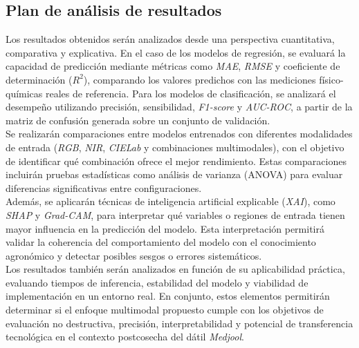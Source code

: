 \subsection{Plan de análisis de resultados}

Los resultados obtenidos serán analizados desde una perspectiva cuantitativa, comparativa y explicativa. En el caso de los modelos de regresión, se evaluará la capacidad de predicción mediante métricas como \textit{MAE}, \textit{RMSE} y coeficiente de determinación (\textit{$R^2$}), comparando los valores predichos con las mediciones físico-químicas reales de referencia. Para los modelos de clasificación, se analizará el desempeño utilizando precisión, sensibilidad, \textit{F1-score} y \textit{AUC-ROC}, a partir de la matriz de confusión generada sobre un conjunto de validación.\\

Se realizarán comparaciones entre modelos entrenados con diferentes modalidades de entrada (\textit{RGB}, \textit{NIR}, \textit{CIELab} y combinaciones multimodales), con el objetivo de identificar qué combinación ofrece el mejor rendimiento. Estas comparaciones incluirán pruebas estadísticas como análisis de varianza (ANOVA) para evaluar diferencias significativas entre configuraciones.\\

Además, se aplicarán técnicas de inteligencia artificial explicable (\textit{XAI}), como \textit{SHAP} y \textit{Grad-CAM}, para interpretar qué variables o regiones de entrada tienen mayor influencia en la predicción del modelo. Esta interpretación permitirá validar la coherencia del comportamiento del modelo con el conocimiento agronómico y detectar posibles sesgos o errores sistemáticos.\\

Los resultados también serán analizados en función de su aplicabilidad práctica, evaluando tiempos de inferencia, estabilidad del modelo y viabilidad de implementación en un entorno real. En conjunto, estos elementos permitirán determinar si el enfoque multimodal propuesto cumple con los objetivos de evaluación no destructiva, precisión, interpretabilidad y potencial de transferencia tecnológica en el contexto postcosecha del dátil \textit{Medjool}.
